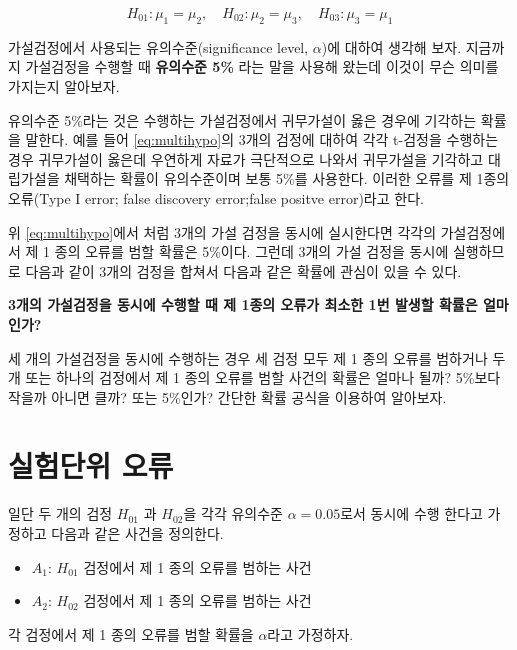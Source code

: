 \documentclass[
]{book}
\providecommand{\tightlist}{%
  \setlength{\itemsep}{0pt}\setlength{\parskip}{0pt}}
\begin{document}
\begin{equation}
H_{01}: \mu_1 = \mu_2, \quad H_{02}: \mu_2 = \mu_3, \quad H_{03}: \mu_3 =\mu_1 
\label{eq:multihypo}
\end{equation}

가설검정에서 사용되는 유의수준(significance level, \(\alpha\))에 대하여
생각해 보자. 지금까지 가설검정을 수행할 때 \textbf{유의수준 5\%} 라는 말을
사용해 왔는데 이것이 무슨 의미를 가지는지 알아보자.

유의수준 5\%라는 것은 수행하는 가설검정에서 귀무가설이 옳은 경우에
기각하는 확률을 말한다. 예를 들어 \eqref{eq:multihypo}의 3개의 검정에
대하여 각각 t-검정을 수행하는 경우 귀무가설이 옳은데 우연하게 자료가
극단적으로 나와서 귀무가설을 기각하고 대립가설을 채택하는 확률이
유의수준이며 보통 5\%를 사용한다. 이러한 오류를 제 1종의 오류(Type I
error; false discovery error;false positve error)라고 한다.

위 \eqref{eq:multihypo}에서 처럼 3개의 가설 검정을 동시에 실시한다면
각각의 가설검정에서 제 1 종의 오류를 범할 확률은 5\%이다. 그런데 3개의
가설 검정을 동시에 실행하므로 다음과 같이 3개의 검정을 합쳐서 다음과
같은 확률에 관심이 있을 수 있다.

\textbf{3개의 가설검정을 동시에 수행할 때 제 1종의 오류가 최소한 1번 발생할
확률은 얼마인가?}

세 개의 가설검정을 동시에 수행하는 경우 세 검정 모두 제 1 종의 오류를
범하거나 두 개 또는 하나의 검정에서 제 1 종의 오류를 범할 사건의 확률은
얼마나 될까? 5\%보다 작을까 아니면 클까? 또는 5\%인가? 간단한 확률 공식을
이용하여 알아보자.

\hypertarget{uxc2e4uxd5d8uxb2e8uxc704-uxc624uxb958}{%
\section{실험단위 오류}\label{uxc2e4uxd5d8uxb2e8uxc704-uxc624uxb958}}

일단 두 개의 검정 \(H_{01}\) 과 \(H_{02}\)을 각각 유의수준 \(\alpha=0.05\)로서
동시에 수행 한다고 가정하고 다음과 같은 사건을 정의한다.

\begin{itemize}
\tightlist
\item
  \(A_1\): \(H_{01}\) 검정에서 제 1 종의 오류를 범하는 사건
\item
  \(A_2\): \(H_{02}\) 검정에서 제 1 종의 오류를 범하는 사건
\end{itemize}

각 검정에서 제 1 종의 오류를 범할 확률을 \(\alpha\)라고 가정하자.
\end{document}
